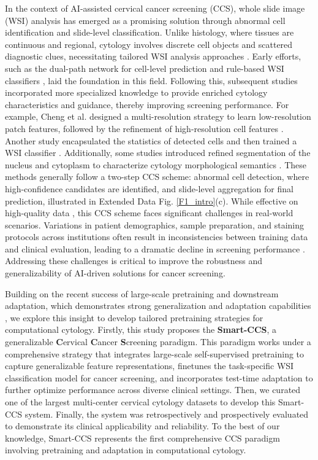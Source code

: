 In the context of AI-assisted cervical cancer screening (CCS), whole slide image (WSI) analysis has emerged as a promising solution through abnormal cell identification and slide-level classification. Unlike histology, where tissues are continuous and regional, cytology involves discrete cell objects and scattered diagnostic clues, necessitating tailored WSI analysis approaches \cite{jiang2023systematic}. Early efforts, such as the dual-path network for cell-level prediction and rule-based WSI classifiers \cite{lin2021dual}, laid the foundation in this field. 
Following this, subsequent studies incorporated more specialized knowledge to provide enriched cytology characteristics and guidance, thereby improving screening performance. For example, Cheng et al. designed a multi-resolution strategy to learn low-resolution patch features, followed by the refinement of high-resolution cell features \cite{cheng2021robust}. Another study encapsulated the statistics of detected cells and then trained a WSI classifier \cite{wang2024artificial}. Additionally, some studies introduced refined segmentation of the nucleus and cytoplasm to characterize cytology morphological semantics \cite{zhu2021hybrid,yu2023ai}.
These methods generally follow a two-step CCS scheme: abnormal cell detection, where high-confidence candidates are identified, and slide-level aggregation for final prediction, illustrated in Extended Data Fig. \ref{F1_intro}(c). While effective on high-quality data \cite{lin2021dual, wang2024artificial}, this CCS scheme faces significant challenges in real-world scenarios. Variations in patient demographics, sample preparation, and staining protocols across institutions often result in inconsistencies between training data and clinical evaluation, leading to a dramatic decline in screening performance \cite{cheng2021robust,zhu2021hybrid}. Addressing these challenges is critical to improve the robustness and generalizability of AI-driven solutions for cancer screening.

Building on the recent success of large-scale pretraining and downstream adaptation, which demonstrates strong generalization and adaptation capabilities \cite{chen2024towards,ma2024towards}, we explore this insight to develop tailored pretraining strategies for computational cytology. 
Firstly, this study proposes the \textbf{Smart-CCS}, a generalizable \textbf{C}ervical \textbf{C}ancer \textbf{S}creening paradigm. 
This paradigm works under a comprehensive strategy that integrates large-scale self-supervised pretraining to capture generalizable feature representations, finetunes the task-specific WSI classification model for cancer screening, and incorporates test-time adaptation to further optimize performance across diverse clinical settings. 
Then, we curated one of the largest multi-center cervical cytology datasets to develop this Smart-CCS system. Finally, the system was retrospectively and prospectively evaluated to demonstrate its clinical applicability and reliability. To the best of our knowledge, Smart-CCS represents the first comprehensive CCS paradigm involving pretraining and adaptation in computational cytology.
